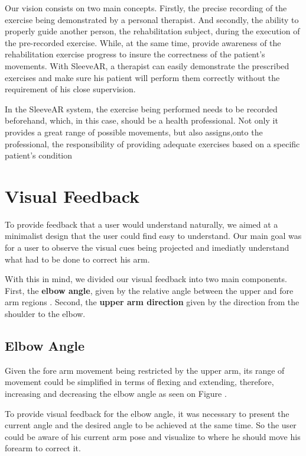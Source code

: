 Our vision consists on two main concepts. Firstly, the precise recording of the exercise being demonstrated by a personal therapist. 
And secondly, the ability to properly guide another person, the rehabilitation subject, during the execution of the pre-recorded exercise. 
While, at the same time, provide awareness of the rehabilitation exercise progress to insure the correctness of the patient's movements.
With SleeveAR, a therapist can easily demonstrate the prescribed exercises and make sure his patient will perform them correctly without the requirement of his close supervision.

In the SleeveAR system, the exercise being performed needs to be recorded beforehand, which, in this case, should be a health professional. 
Not only it provides a great range of possible movements, but also assigns,onto the professional, the responsibility of providing adequate exercises based on a specific patient's condition


\section{Visual Feedback}

To provide feedback that a user would understand naturally, we aimed at a minimalist design that the user could find easy to understand. 
Our main goal was for a user to observe the visual cues being projected and imediatly understand what had to be done to correct his arm.

With this in mind, we divided our visual feedback into two main components. 
First, the \textbf{elbow angle}, given by the relative angle between the upper and fore arm regions . 
Second, the \textbf{upper arm direction} given by the direction from the shoulder to the elbow.


\subsection{Elbow Angle}

Given the fore arm movement being restricted by the upper arm, its range of movement could be simplified in terms of flexing and extending, therefore, increasing and decreasing the elbow angle as seen on Figure .

To provide visual feedback for the elbow angle, it was necessary to present the current angle and the desired angle to be achieved at the same time. So the user could be aware of his current arm pose and visualize to where he should move his forearm to correct it.

